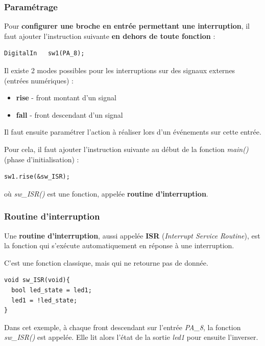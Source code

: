 \documentclass[a4paper,11pt,titlepage]{article} %
\begin{document}
\subsubsection{Paramétrage}

Pour \textbf{configurer une broche en entrée permettant une interruption}, il faut ajouter l'instruction suivante \textbf{en dehors de toute fonction} :

\begin{lstlisting}
DigitalIn   sw1(PA_8);
\end{lstlisting}

\medskip

Il existe 2 modes possibles pour les interruptions sur des signaux externes (entrées numériques) : 

\begin{itemize}
	\item \textbf{rise} - front montant d'un signal
	\item \textbf{fall} - front descendant d'un signal
\end{itemize}

\medskip

Il faut ensuite paramétrer l'action à réaliser lors d'un événements sur cette entrée.

Pour cela, il faut ajouter l'instruction suivante au début de la fonction \textsl{main()} (phase d'initialisation) :

\begin{lstlisting}
sw1.rise(&sw_ISR);
\end{lstlisting}

où \textsl{sw\_ISR()} est une fonction, appelée \textbf{routine d'interruption}.

\subsubsection{Routine d'interruption}

Une \textbf{routine d'interruption}, aussi appelée \textbf{ISR} (\textit{Interrupt Service Routine}), est la fonction qui s'exécute automatiquement en réponse à une interruption. 

C'est une fonction classique, mais qui ne retourne pas de donnée.

\begin{lstlisting}
void sw_ISR(void){
  bool led_state = led1;
  led1 = !led_state;
} 
\end{lstlisting}

Dans cet exemple, à chaque front descendant sur l'entrée \textsl{PA\_8}, la fonction \textsl{sw\_ISR()} est appelée. Elle lit alors l'état de la sortie \textsl{led1} pour ensuite l'inverser.
\end{document}
